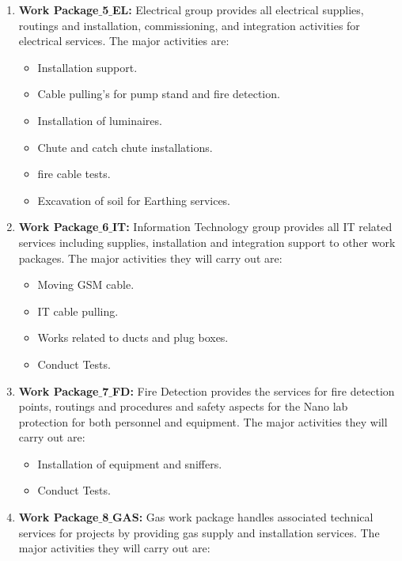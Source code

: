 \begin{enumerate}
\begin{itemize}
	\end{itemize}
	
	\item \textbf{Work Package$\_$5$\_$EL:} Electrical group provides all electrical supplies, routings and installation, commissioning, and integration activities for electrical services. The major activities are:
	\begin{itemize}
		\item Installation support.
		\item Cable pulling’s for pump stand and fire detection.
		\item Installation of luminaires.
		\item Chute and catch chute installations.
		\item fire cable tests.
		\item Excavation of soil for Earthing services.	
	\end{itemize}
	
	\item \textbf{Work Package$\_$6$\_$IT:} Information Technology group provides all IT related services including supplies, installation and integration support to other work packages. The major activities they will carry out are: 
	
	\begin{itemize}
		\item Moving GSM cable.
		\item IT cable pulling.
		\item Works related to ducts and plug boxes.
		\item Conduct Tests.

	\end{itemize}
	
	\item \textbf{Work Package$\_$7$\_$FD:} Fire Detection provides the services for fire detection points, routings and procedures and safety aspects for the Nano lab protection for both personnel and equipment. The major activities they will carry out are:
	
	\begin{itemize}
		\item Installation of equipment and sniffers.
		\item Conduct Tests.
	\end{itemize}
	
	\item \textbf{Work Package$\_$8$\_$GAS:} Gas work package handles associated technical services for projects by providing gas supply and installation services. The major activities they will carry out are:
	

\end{enumerate}
